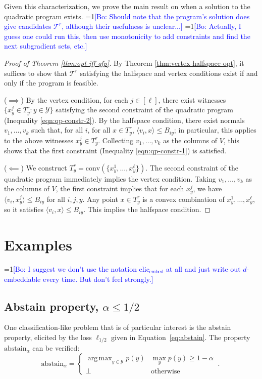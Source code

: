 \documentclass[anon]{colt2020} %
\newcommand{\Comments}{1}
\newcommand{\mynote}[2]{\ifnum\Comments=1\textcolor{#1}{#2}\fi}
\newcommand{\bo}[1]{\mynote{blue}{[Bo: #1]}}
\newcommand{\elicembed}{\mathrm{elic}_\mathrm{embed}}
\newcommand{\abstain}[1]{\mathrm{abstain}_{#1}}
\newcommand{\T}{\mathcal{T}}
\newcommand{\Y}{\mathcal{Y}}
\newcommand{\ellabs}[1]{\ell_{#1}}
\newcommand{\inprod}[2]{\langle #1, #2 \rangle}%
\newcommand{\conv}{\mathrm{conv}}
\DeclareMathOperator*{\argmax}{arg\,max}
\begin{document}
Given this characterization, we prove the main result on when a solution to the quadratic program exists.
\bo{Should note that the program's solution does give candidates $\T^r$, although their usefulness is unclear...}
\bo{Actually, I guess one could run this, then use monotonicity to add constraints and find the next subgradient sets, etc.}

\begin{proof}[Proof of Theorem \ref{thm:opt-iff-qfp}]
    By Theorem \ref{thm:vertex-halfspace-opt}, it suffices to show that $\T^r$ satisfying the halfspace and vertex conditions exist if and only if the program is feasible.

  ($\implies$) 
  By the vertex condition, for each $j \in [\ell]$, there exist witnesses $\{x^j_y \in T^r_y : y \in \Y\}$ satisfying the second constraint of the quadratic program (Inequality \ref{eqn:qp-constr-2}).
  By the halfspace condition, there exist normals $v_1, \dots, v_k$ such that, for all $i$, for all $x \in T^r_y$, $\inprod{v_i}{x} \leq B_{iy}$; in particular, this applies to the above witnesses $x^j_y \in T^r_y$.
  Collecting $v_1,\dots,v_k$ as the columns of $V$, this shows that the first constraint (Inequality \ref{eqn:qp-constr-1}) is satisfied.

  \bigskip
  ($\impliedby$)
  We construct $T^r_y = \conv(\{x^1_y, \ldots, x^{\ell}_y\})$.
  The second constraint of the quadratic program immediately implies the vertex condition.
  Taking $v_1,\dots,v_k$ as the columns of $V$, the first constraint implies that for each $x^j_y$, we have $\inprod{v_i}{x^j_y} \leq B_{iy}$ for all $i,j,y$.
  Any point $x \in T^r_y$ is a convex combination of $x^1_y,\ldots,x^{\ell}_y$, so it satisfies $\inprod{v_i}{x} \leq B_{iy}$.
  This implies the halfspace condition.  %
\end{proof}

  


\section{Examples}\label{sec:examples}
\bo{I suggest we don't use the notation $\elicembed$ at all and just write out $d$-embeddable every time. But don't feel strongly.}
\subsection{Abstain property, $\alpha \leq 1/2$}\label{subsec:example-abstain}
One classification-like problem that is of particular interest is the abstain property, elicited by the loss $\ellabs{1/2}$ given in Equation~\ref{eq:abstain}.
The property $\abstain{\alpha}$ can be verified:
\begin{equation}\label{eq:abstain-prop}
     \abstain{\alpha} = \begin{cases}
     \argmax_{y \in \Y} p(y) & \max_y p(y) \geq 1 - \alpha\\ 
     \bot & \text{otherwise}
     \end{cases}~.~
\end{equation}
\end{document}
